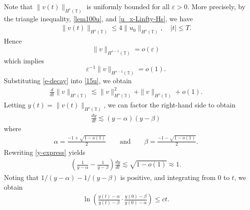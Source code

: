 \documentclass[12pt,reqno]{amsart}
\newcommand{\ci}{\mathbb{T}}
\newcommand{\ee}{\varepsilon}
\theoremstyle{plain}  %
\theoremstyle{definition}
\begin{document}
%
%
Note
that $\|v(t)\|_{H^s(\ci)}$ is uniformly bounded for all $\ee > 0$. More 
precisely, by
the triangle inequality,  \eqref{lem100u}, and \eqref{u_x-Linfty-Hs},
we have
%
%
\begin{equation}
	\label{bound-no-ep}
\begin{split}
\|v(t) \|_{H^s(\ci)}
\le 4 \|u_0\|_{H^s(\ci)}, \quad |t| \le T.
\end{split}
\end{equation}
%
%
Hence
\begin{equation*}
\|v\|_{H^{s-1}(\ci)} = o(\ee)
\end{equation*}
%
%
which implies
\begin{equation}
	\label{e-decay}
	\ee^{-1} \|v\|_{H^{s-1}(\ci)} = o(1).
\end{equation}
%
%
Substituting \eqref{e-decay} into \eqref{15u}, we obtain
%
%
\begin{equation}
\begin{split}
\frac{d}{dt} \|v\|_{H^s(\ci)} \lesssim
\|v\|_{H^s(\ci)}^2 + \|v\|_{H^s(\ci)} + o(1).
\label{202x}
\end{split}
\end{equation}
%
%
Letting $y(t) = \|v(t)\|_{H^s(\ci)}$, we can factor the right-hand side to 
obtain
%
%
\begin{equation}
	\label{y-express}
	\begin{split}
		\frac{dy}{dt} \lesssim (y-\alpha)(y-\beta)	
	\end{split}
\end{equation}
%
%
where
%
%
\begin{equation}
	\begin{split}
		\alpha = \frac{-1 + \sqrt{1-o(1)}}{2} \qquad \text{and} \qquad
		\beta = \frac{-1 - \sqrt{1-o(1)}}{2}.
	\end{split}
\end{equation}
%
%
Rewriting \eqref{y-express} yields
%
%
\begin{equation*}
	\begin{split}
		\left( \frac{1}{y-\alpha} - \frac{1}{y-\beta} 
		\right) \frac{dy}{dt} \lesssim \sqrt{1- o(1)} \approx 1.
	\end{split}
\end{equation*}
%
%
Noting that $1/(y - \alpha) - 1/(y - \beta)$ is positive, and integrating 
from $0$ to $t$, we obtain 
%
%
\begin{equation*}
	\begin{split}
		\ln \left (\frac{y(t) - \alpha}{y(t) - \beta} \cdot 
		\frac{y(0) - \beta}{y(0) - \alpha} \right ) \le ct.	
	\end{split}
\end{equation*}
\end{document}
